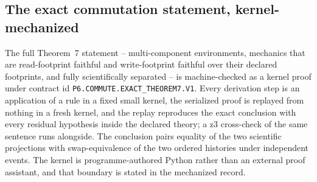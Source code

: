 \subsection{The exact commutation statement, kernel-mechanized}

\label{sec:kernel-theorem7}

The full Theorem~7 statement -- multi-component environments, mechanics that
are read-footprint faithful and write-footprint faithful over their declared
footprints, and fully scientifically separated -- is machine-checked as a
kernel proof under contract id
\texttt{P6.COMMUTE.EXACT\_THEOREM7.V1}. Every derivation step is an
application of a rule in a fixed small kernel, the serialized proof is
replayed from nothing in a fresh kernel, and the replay reproduces the exact
conclusion with every residual hypothesis inside the declared theory; a z3
cross-check of the same sentence runs alongside. The conclusion pairs
equality of the two scientific projections with swap-equivalence of the two
ordered histories under independent events. The kernel is programme-authored
Python rather than an external proof assistant, and that boundary is stated
in the mechanized record.
